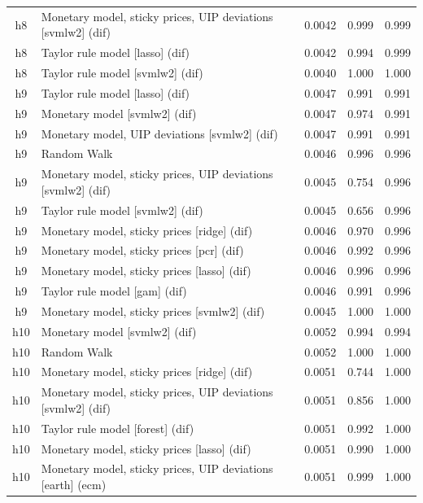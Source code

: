 \begin{ThreePartTable}
\begin{longtable}[t]{cp{5.5cm}ccc}
h8 & \raggedright Monetary model, sticky prices, UIP deviations [svmlw2] (dif) & 0.0042 & 0.999 & 0.999\\
h8 & \raggedright Taylor rule model [lasso] (dif) & 0.0042 & 0.994 & 0.999\\
h8 & \raggedright Taylor rule model [svmlw2] (dif) & 0.0040 & 1.000 & 1.000\\
\addlinespace
h9 & \raggedright Taylor rule model [lasso] (dif) & 0.0047 & 0.991 & 0.991\\
h9 & \raggedright Monetary model [svmlw2] (dif) & 0.0047 & 0.974 & 0.991\\
h9 & \raggedright Monetary model, UIP deviations [svmlw2] (dif) & 0.0047 & 0.991 & 0.991\\
h9 & \raggedright Random Walk & 0.0046 & 0.996 & 0.996\\
h9 & \raggedright Monetary model, sticky prices, UIP deviations [svmlw2] (dif) & 0.0045 & 0.754 & 0.996\\
h9 & \raggedright Taylor rule model [svmlw2] (dif) & 0.0045 & 0.656 & 0.996\\
h9 & \raggedright Monetary model, sticky prices [ridge] (dif) & 0.0046 & 0.970 & 0.996\\
h9 & \raggedright Monetary model, sticky prices [pcr] (dif) & 0.0046 & 0.992 & 0.996\\
h9 & \raggedright Monetary model, sticky prices [lasso] (dif) & 0.0046 & 0.996 & 0.996\\
h9 & \raggedright Taylor rule model [gam] (dif) & 0.0046 & 0.991 & 0.996\\
h9 & \raggedright Monetary model, sticky prices [svmlw2] (dif) & 0.0045 & 1.000 & 1.000\\
\addlinespace
h10 & \raggedright Monetary model [svmlw2] (dif) & 0.0052 & 0.994 & 0.994\\
h10 & \raggedright Random Walk & 0.0052 & 1.000 & 1.000\\
h10 & \raggedright Monetary model, sticky prices [ridge] (dif) & 0.0051 & 0.744 & 1.000\\
h10 & \raggedright Monetary model, sticky prices, UIP deviations [svmlw2] (dif) & 0.0051 & 0.856 & 1.000\\
h10 & \raggedright Taylor rule model [forest] (dif) & 0.0051 & 0.992 & 1.000\\
h10 & \raggedright Monetary model, sticky prices [lasso] (dif) & 0.0051 & 0.990 & 1.000\\
h10 & \raggedright Monetary model, sticky prices, UIP deviations [earth] (ecm) & 0.0051 & 0.999 & 1.000\\

\end{longtable}
\end{ThreePartTable}
